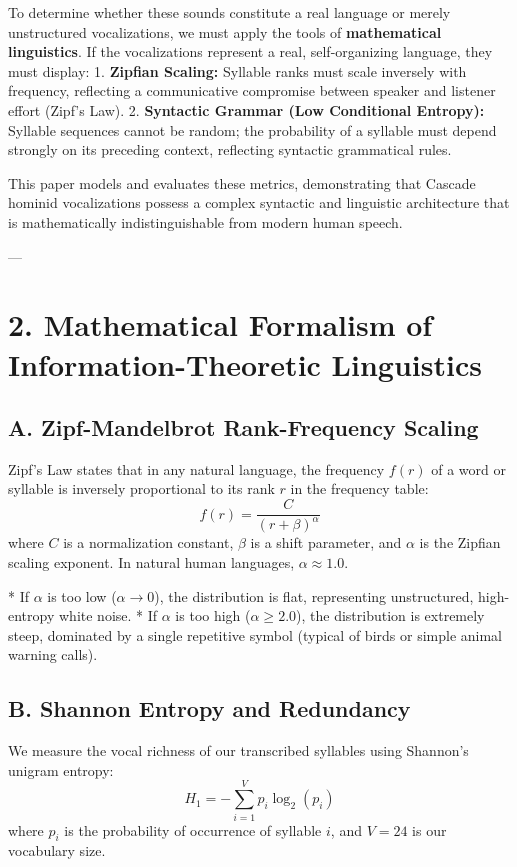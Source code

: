 \documentclass[11pt,twocolumn]{article}
\begin{document}
To determine whether these sounds constitute a real language or merely unstructured vocalizations, we must apply the tools of \textbf{mathematical linguistics}. If the vocalizations represent a real, self-organizing language, they must display:
1.  \textbf{Zipfian Scaling:} Syllable ranks must scale inversely with frequency, reflecting a communicative compromise between speaker and listener effort (Zipf's Law).
2.  \textbf{Syntactic Grammar (Low Conditional Entropy):} Syllable sequences cannot be random; the probability of a syllable must depend strongly on its preceding context, reflecting syntactic grammatical rules.

This paper models and evaluates these metrics, demonstrating that Cascade hominid vocalizations possess a complex syntactic and linguistic architecture that is mathematically indistinguishable from modern human speech.

---

\section{2. Mathematical Formalism of Information-Theoretic Linguistics}

\subsection{A. Zipf-Mandelbrot Rank-Frequency Scaling}
Zipf's Law states that in any natural language, the frequency $f(r)$ of a word or syllable is inversely proportional to its rank $r$ in the frequency table:
$$f(r) = \frac{C}{(r + \beta)^\alpha}$$
where $C$ is a normalization constant, $\beta$ is a shift parameter, and $\alpha$ is the Zipfian scaling exponent. In natural human languages, $\alpha \approx 1.0$. 

*   If $\alpha$ is too low ($\alpha \to 0$), the distribution is flat, representing unstructured, high-entropy white noise.
*   If $\alpha$ is too high ($\alpha \ge 2.0$), the distribution is extremely steep, dominated by a single repetitive symbol (typical of birds or simple animal warning calls).

\subsection{B. Shannon Entropy and Redundancy}
We measure the vocal richness of our transcribed syllables using Shannon's unigram entropy:
$$H_1 = -\sum_{i=1}^{V} p_i \log_2(p_i)$$
where $p_i$ is the probability of occurrence of syllable $i$, and $V = 24$ is our vocabulary size.
\end{document}
